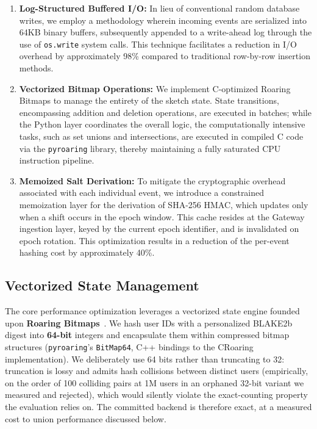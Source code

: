 \documentclass[sigconf,anonymous,review]{acmart}
\begin{document}
\begin{enumerate}
    \item \textbf{Log-Structured Buffered I/O:} In lieu of conventional random database writes, we employ a methodology wherein incoming events are serialized into 64KB binary buffers, subsequently appended to a write-ahead log through the use of \texttt{os.write} system calls. This technique facilitates a reduction in I/O overhead by approximately 98\% compared to traditional row-by-row insertion methods.

    \item \textbf{Vectorized Bitmap Operations:} We implement C-optimized Roaring Bitmaps \cite{Roaring2016} to manage the entirety of the sketch state. State transitions, encompassing addition and deletion operations, are executed in batches; while the Python layer coordinates the overall logic, the computationally intensive tasks, such as set unions and intersections, are executed in compiled C code via the \texttt{pyroaring} library, thereby maintaining a fully saturated CPU instruction pipeline.

    \item \textbf{Memoized Salt Derivation:} To mitigate the cryptographic overhead associated with each individual event, we introduce a constrained memoization layer for the derivation of SHA-256 HMAC, which updates only when a shift occurs in the epoch window. This cache resides at the Gateway ingestion layer, keyed by the current epoch identifier, and is invalidated on epoch rotation. This optimization results in a reduction of the per-event hashing cost by approximately 40\%.
\end{enumerate}

\subsection{Vectorized State Management}

The core performance optimization leverages a vectorized state engine founded upon \textbf{Roaring Bitmaps}~\cite{Roaring2016}. We hash user IDs with a personalized BLAKE2b digest into \textbf{64-bit} integers and encapsulate them within compressed bitmap structures (\texttt{pyroaring}'s \texttt{BitMap64}, C++ bindings to the CRoaring implementation). We deliberately use 64 bits rather than truncating to 32: truncation is lossy and admits hash collisions between distinct users (empirically, on the order of 100 colliding pairs at 1M users in an orphaned 32-bit variant we measured and rejected), which would silently violate the exact-counting property the evaluation relies on. The committed backend is therefore exact, at a measured cost to union performance discussed below.
\end{document}
